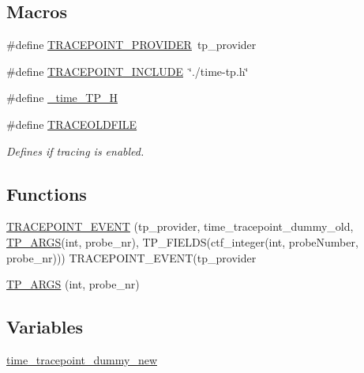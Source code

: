 \subsection*{Macros}
\begin{DoxyCompactItemize}
\item 
\#define \hyperlink{time-tp_8h_a6751837690af3a0ad19fb209a69dd16e}{T\+R\+A\+C\+E\+P\+O\+I\+N\+T\+\_\+\+P\+R\+O\+V\+I\+D\+ER}~tp\+\_\+provider
\item 
\#define \hyperlink{time-tp_8h_a090261faa16d05fb6993d61861ba8ff9}{T\+R\+A\+C\+E\+P\+O\+I\+N\+T\+\_\+\+I\+N\+C\+L\+U\+DE}~\char`\"{}./time-\/tp.\+h\char`\"{}
\item 
\#define \hyperlink{time-tp_8h_ad91ef7d5cc408393bcfaf376512d4ce7}{\+\_\+time\+\_\+\+T\+P\+\_\+H}
\item 
\#define \hyperlink{time-tp_8h_a36d219a400a7a885e95c8e51318b4180}{T\+R\+A\+C\+E\+O\+L\+D\+F\+I\+LE}
\begin{DoxyCompactList}\small\item\em Defines if tracing is enabled. \end{DoxyCompactList}\end{DoxyCompactItemize}
\subsection*{Functions}
\begin{DoxyCompactItemize}
\item 
\hyperlink{time-tp_8h_a2b7f574c00f7fe1cbd4b66ccca5e2fab}{T\+R\+A\+C\+E\+P\+O\+I\+N\+T\+\_\+\+E\+V\+E\+NT} (tp\+\_\+provider, time\+\_\+tracepoint\+\_\+dummy\+\_\+old, \hyperlink{time-tp_8h_a94a7a81b68dcdbeece169da86213a640}{T\+P\+\_\+\+A\+R\+GS}(int, probe\+\_\+nr), T\+P\+\_\+\+F\+I\+E\+L\+DS(ctf\+\_\+integer(int, probe\+Number, probe\+\_\+nr))) T\+R\+A\+C\+E\+P\+O\+I\+N\+T\+\_\+\+E\+V\+E\+NT(tp\+\_\+provider
\item 
\hyperlink{time-tp_8h_a94a7a81b68dcdbeece169da86213a640}{T\+P\+\_\+\+A\+R\+GS} (int, probe\+\_\+nr)
\end{DoxyCompactItemize}
\subsection*{Variables}
\begin{DoxyCompactItemize}
\item 
\hyperlink{time-tp_8h_a5bbda58654652cd1266ef94415814b2d}{time\+\_\+tracepoint\+\_\+dummy\+\_\+new}
\end{DoxyCompactItemize}


